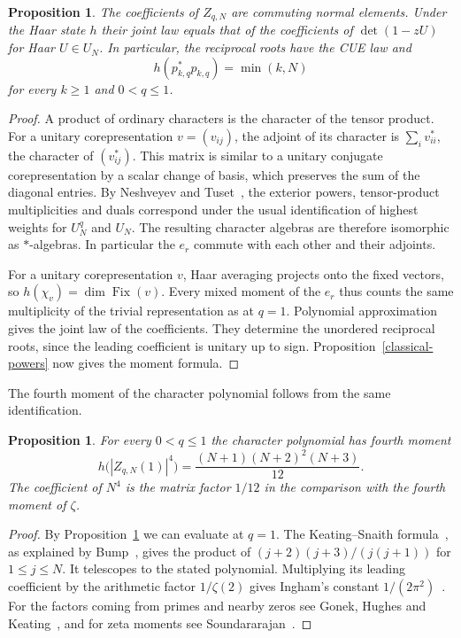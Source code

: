 \documentclass[11pt,a4paper]{article}
\newtheorem{prop}[thm]{Proposition}
\begin{document}
\begin{samepage}
\begin{prop}\label{cue}
The coefficients of $Z_{q,N}$ are commuting normal elements. Under the Haar state $h$ their joint law equals that of the coefficients of $\det(1-zU)$ for Haar $U\in U_N$. In particular, the reciprocal roots have the CUE law and
\[
 h(p_{k,q}^*p_{k,q})=\min(k,N)
\]
for every $k\geq1$ and $0<q\leq1$.
\end{prop}
\end{samepage}
\begin{proof}
A product of ordinary characters is the character of the tensor product. For a unitary corepresentation $v=(v_{ij})$, the adjoint of its character is $\sum_i v_{ii}^*$, the character of $(v_{ij}^*)$. This matrix is similar to a unitary conjugate corepresentation by a scalar change of basis, which preserves the sum of the diagonal entries. By Neshveyev and Tuset~\cite{nt}, the exterior powers, tensor-product multiplicities and duals correspond under the usual identification of highest weights for $U_N^q$ and $U_N$. The resulting character algebras are therefore isomorphic as $*$-algebras. In particular the $e_r$ commute with each other and their adjoints.

For a unitary corepresentation $v$, Haar averaging projects onto the fixed vectors, so $h(\chi_v)=\dim\operatorname{Fix}(v)$. Every mixed moment of the $e_r$ thus counts the same multiplicity of the trivial representation as at $q=1$. Polynomial approximation gives the joint law of the coefficients. They determine the unordered reciprocal roots, since the leading coefficient is unitary up to sign. Proposition~\ref{classical-powers} now gives the moment formula.
\end{proof}

The fourth moment of the character polynomial follows from the same identification.

\begin{samepage}
\begin{prop}
For every $0<q\leq1$ the character polynomial has fourth moment
\[
 h\big(|Z_{q,N}(1)|^4\big)=\frac{(N+1)(N+2)^2(N+3)}{12}.
\]
The coefficient of $N^4$ is the matrix factor $1/12$ in the comparison with the fourth moment of $\zeta$.
\end{prop}
\end{samepage}
\begin{proof}
By Proposition~\ref{cue} we can evaluate at $q=1$. The Keating--Snaith formula~\cite{ks}, as explained by Bump~\cite{bump}, gives the product of $(j+2)(j+3)/(j(j+1))$ for $1\leq j\leq N$. It telescopes to the stated polynomial. Multiplying its leading coefficient by the arithmetic factor $1/\zeta(2)$ gives Ingham's constant $1/(2\pi^2)$~\cite{ingham}. For the factors coming from primes and nearby zeros see Gonek, Hughes and Keating~\cite{ghk}, and for zeta moments see Soundararajan~\cite{sound}.
\end{proof}
\end{document}
